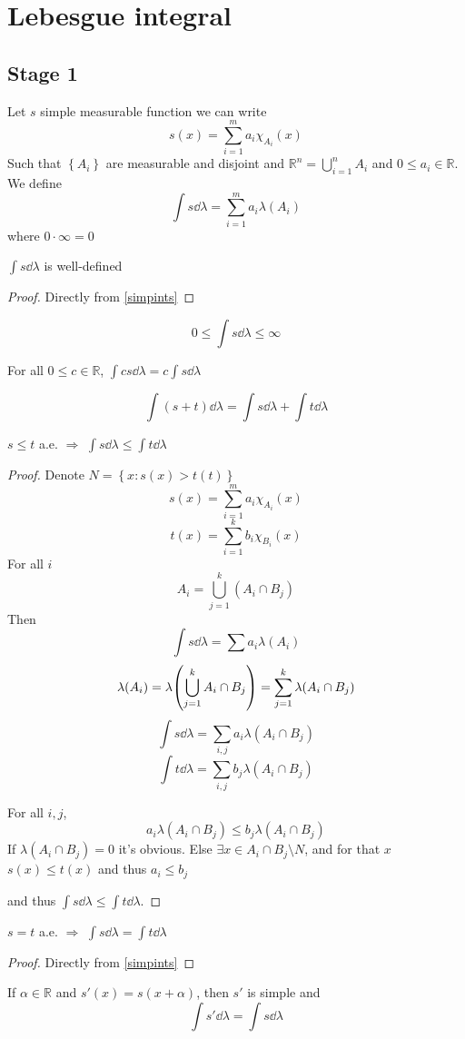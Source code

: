 \section{Lebesgue integral}
\subsection{Stage 1}
Let $s$ simple measurable function we can write
$$s(x) = \sum_{i=1}^m a_i \chi_{A_i} (x)$$
Such that $\left\{  A_i\right\}$ are measurable and disjoint and $\mathbb{R}^n = \bigcup_{i=1}^n A_i$ and $0\leq a_i \in \mathbb{R}$. We define
$$\int s\dd{\lambda} = \sum_{i=1}^m a_i \lambda(A_i)$$
where $0\cdot \infty =0$
\begin{prop}
	$\int s\dd{\lambda}$ is well-defined
	\begin{proof}
	 Directly from \ref{simpints}
	\end{proof}
\end{prop} 
\begin{prop}
$$0\leq \int s\dd{\lambda} \leq \infty$$
\end{prop} 
\begin{prop}
For all $0\leq c \in \mathbb{R}$, $\int cs\dd{\lambda} = c\int s\dd{\lambda}$
\end{prop} 
\begin{prop}
$$\int (s+t) \dd{\lambda} = \int s \dd{\lambda} + \int t \dd{\lambda}$$
\end{prop} 
\begin{prop} \label{simpints}
$s\leq t$ a.e. $\Rightarrow$ $\int s\dd{\lambda} \leq \int t \dd{\lambda}$
\begin{proof}
	
	Denote $N = \left\{ x: s(x)> t(t) \right\}$
	$$s(x) = \sum_{i=1}^{m} a_i \chi_{A_i}(x)$$
	$$t(x) = \sum_{i=1}^{k} b_i \chi_{B_i}(x)$$
	For all $i$
	$$A_i = \bigcup_{j=1}^k (A_i \cap B_j) $$
	Then
	$$\int s \dd{\lambda} = \sum a_i \lambda(A_i) $$
	$$\lambda(A_i) = \lambda\qty(\bigcup_{j=1}^k A_i \cap B_j) = \sum_{j=1}^k \lambda(A_i \cap B_j)$$
	$$\int s\dd{\lambda} = \sum_{i,j} a_i \lambda(A_i \cap B_j)$$
	$$\int t\dd{\lambda} = \sum_{i,j} b_j \lambda(A_i \cap B_j)$$
	
	For all $i,j$, $$a_i\lambda(A_i\cap B_j) \leq b_j \lambda(A_i\cap B_j)$$
	If $\lambda(A_i\cap B_j)=0$ it's obvious. Else $\exists x \in A_i\cap B_j \setminus N$, and for that $x$ $s(x) \leq t(x)$ and thus $a_i\leq b_j$
	
	and thus $\int s\dd{\lambda} \leq \int t \dd{\lambda}$.
\end{proof}
\end{prop} 
\begin{prop}
	$s= t$ a.e. $\Rightarrow$ $\int s\dd{\lambda} = \int t \dd{\lambda}$
	
	\begin{proof}
		Directly from \ref{simpints}
	\end{proof}
\end{prop} 
\begin{prop}
If $\alpha \in \mathbb{R}$ and $s'(x) = s(x+\alpha)$, then $s'$ is simple and 
$$\int s' \dd{\lambda} = \int s \dd{\lambda}$$
\end{prop} 


